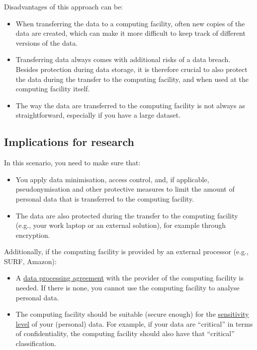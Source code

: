 \documentclass[
]{book}
\providecommand{\tightlist}{%
  \setlength{\itemsep}{0pt}\setlength{\parskip}{0pt}}
\begin{document}
Disadvantages of this approach can be:

\begin{itemize}
\tightlist
\item
  When transferring the data to a computing facility, often new copies of the
  data are created, which can make it more difficult to keep track of different
  versions of the data.
\item
  Transferring data always comes with additional risks of a data breach. Besides
  protection during data storage, it is therefore crucial to also protect the data
  during the transfer to the computing facility, and when used at the computing
  facility itself.\\
\item
  The way the data are transferred to the computing facility is not always as
  straightforward, especially if you have a large dataset.
\end{itemize}

\hypertarget{implications-for-research}{%
\subsection{Implications for research}\label{implications-for-research}}

In this scenario, you need to make sure that:

\begin{itemize}
\tightlist
\item
  You apply data minimisation, access control, and, if applicable,
  pseudonymisation and other protective measures to limit the amount of personal
  data that is transferred to the computing facility.
\item
  The data are also protected during the transfer to the computing facility
  (e.g., your work laptop or an external solution), for example through encryption.
\end{itemize}

Additionally, if the computing facility is provided by an external processor
(e.g., SURF, Amazon):

\begin{itemize}
\tightlist
\item
  A \protect\hyperlink{data-processing-agreement}{data processing agreement} with the provider of
  the computing facility is needed. If there is none, you cannot use the computing
  facility to analyse personal data.
\item
  The computing facility should be suitable (secure enough) for the
  \protect\hyperlink{data-classification}{sensitivity level} of your (personal) data. For example,
  if your data are ``critical'' in terms of confidentiality, the computing facility
  should also have that ``critical'' classification.
\end{itemize}
\end{document}

